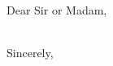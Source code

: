 \documentclass[a4paper,11pt]{article}
\begin{document}

\vspace{10mm}

\contactinfo

Dear Sir or Madam,
\noindent


~\\
\flushleft
Sincerely, \\ \vspace{15mm}
\who
\end{document}
